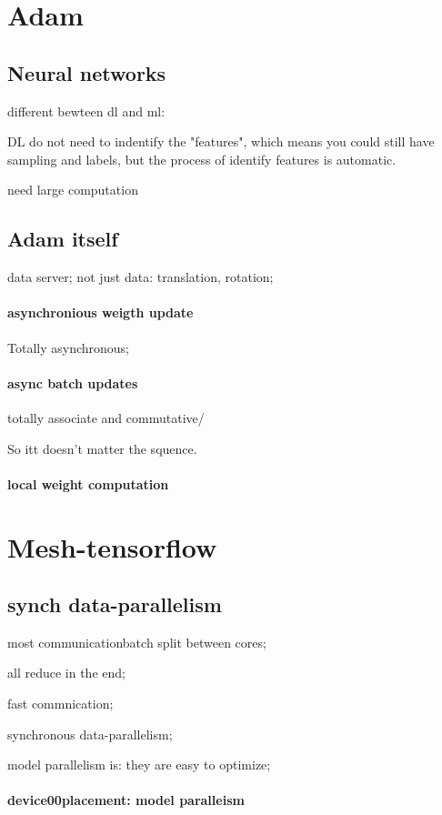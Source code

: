 \documentclass[12pt]{article}
\begin{document}
\section{Adam}
\subsection{Neural networks}
different bewteen dl and ml:

DL do not need to indentify the "features", which means you could still have sampling and labels, but the process of identify features is automatic.

need large computation

\subsection{Adam itself}
data server; not just data: translation, rotation;
\paragraph{asynchronious weigth update}
Totally asynchronous;
\paragraph{async batch updates}

totally associate and commutative/

So itt doesn't matter the squence.

\paragraph{local weight computation}


\section{Mesh-tensorflow}
\subsection{synch data-parallelism}
most communicationbatch split between cores;

all reduce in the end;

fast commnication;

synchronous data-parallelism;

model parallelism is: they are easy to optimize;

\paragraph{device00placement: model paralleism}
 
\end{document}
